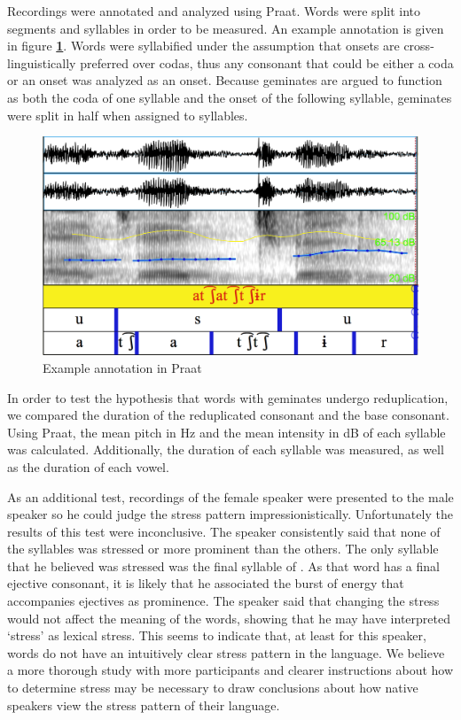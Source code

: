 \documentclass[12pt]{article}
\begin{document}
Recordings were annotated and analyzed using Praat. Words were split into segments and syllables in order to be measured. An example annotation is given in figure \textbf{\ref{fig:annotate}}. Words were syllabified under the assumption that onsets are cross-linguistically preferred over codas, thus any consonant that could be either a coda or an onset was analyzed as an onset. Because geminates are argued to function as both the coda of one syllable and the onset of the following syllable, geminates were split in half when assigned to syllables.

\begin{figure}[h]
	\centering
	\caption{Example annotation in Praat \label{fig:annotate}}
	\includegraphics[width=.8\textwidth]{exann.png}
\end{figure}



In order to test the hypothesis that words with geminates undergo reduplication, we compared the duration of the reduplicated consonant and the base consonant. Using Praat, the mean pitch in Hz and the mean intensity in dB of each syllable was calculated. Additionally, the duration of each syllable was measured, as well as the duration of each vowel. 

As an additional test, recordings of the female speaker were presented to the male speaker so he could judge the stress pattern impressionistically. Unfortunately the results of this test were inconclusive. The speaker consistently said that none of the syllables was stressed or more prominent than the others. The only syllable that he believed was stressed was the final syllable of \emph{}. As that word has a final ejective consonant, it is likely that he associated the burst of energy that accompanies ejectives as prominence. The speaker said that changing the stress would not affect the meaning of the words, showing that he may have interpreted `stress' as lexical stress. This seems to indicate that, at least for this speaker, words do not have an intuitively clear stress pattern in the language. We believe a more thorough study with more participants and clearer instructions about how to determine stress may be necessary to draw conclusions about how native speakers view the stress pattern of their language. 
\end{document}
